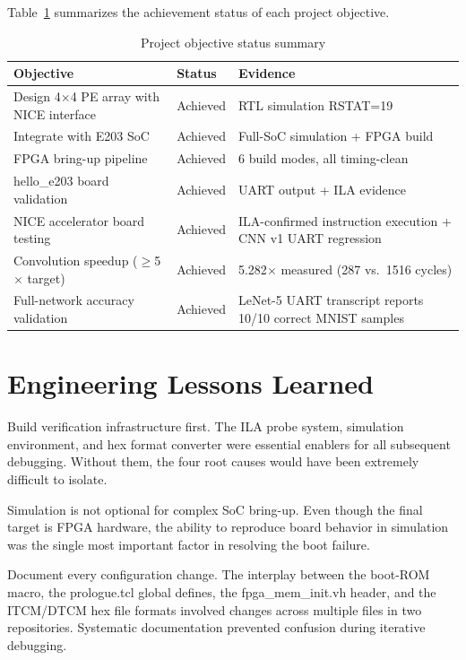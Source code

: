 Table~\ref{tab:5_1} summarizes the achievement status of each project objective.

\begin{table}[htbp]
\centering
\small
\caption{Project objective status summary}
\label{tab:5_1}
\begin{tabularx}{\textwidth}{l>{\centering\arraybackslash}p{2cm}X}
\hline
Objective & Status & Evidence \\ \hline\hline
Design 4$\times$4 PE array with NICE interface & Achieved & RTL simulation RSTAT=19 \\ \hline
Integrate with E203 SoC & Achieved & Full-SoC simulation + FPGA build \\ \hline
FPGA bring-up pipeline & Achieved & 6 build modes, all timing-clean \\ \hline
hello\_e203 board validation & Achieved & UART output + ILA evidence \\ \hline
NICE accelerator board testing & Achieved & ILA-confirmed instruction execution + CNN v1 UART regression \\ \hline
Convolution speedup ($\geq$5$\times$ target) & Achieved & 5.282$\times$ measured (287 vs.\ 1516 cycles) \\ \hline
Full-network accuracy validation & Achieved & LeNet-5 UART transcript reports 10/10 correct MNIST samples \\ \hline
\end{tabularx}
\end{table}

\section{Engineering Lessons Learned}\label{sec:5_4}

Build verification infrastructure first. The ILA probe system, simulation environment, and hex format converter were essential enablers for all subsequent debugging. Without them, the four root causes would have been extremely difficult to isolate.


Simulation is not optional for complex SoC bring-up. Even though the final target is FPGA hardware, the ability to reproduce board behavior in simulation was the single most important factor in resolving the boot failure.


Document every configuration change. The interplay between the boot-ROM macro, the prologue.tcl global defines, the fpga\_mem\_init.vh header, and the ITCM/DTCM hex file formats involved changes across multiple files in two repositories. Systematic documentation prevented confusion during iterative debugging.


